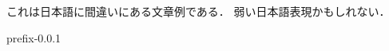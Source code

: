 \documentclass[uplatex]{jsarticle}
\begin{document}
これは日本語に間違いにある文章例である．
弱い日本語表現かもしれない．

prefix-0.0.1
\end{document}
